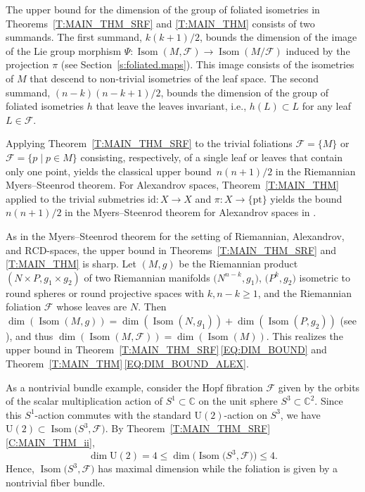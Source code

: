 \documentclass[10pt,a4paper]{amsart}
\numberwithin{equation}{section}
\theoremstyle{definition}
\DeclareMathOperator{\Iso}{Isom}
\newcommand{\C}{\mathbb{C}} %
\newcommand{\fol}{\mathcal{F}}
\begin{document}
The upper bound for the dimension of the group of foliated isometries in Theorems~\ref{T:MAIN_THM_SRF} and \ref{T:MAIN_THM} consists of two summands. The first summand, $k(k+1)/2$, bounds the dimension of the image of the Lie group morphism $\Psi\colon \Iso(M,\fol)\to \Iso(M/\fol)$ induced by the projection $\pi$ (see Section~\ref{s:foliated.maps}).
This image consists of the isometries of $M$ that descend to non-trivial isometries of the leaf space. The second summand, $(n-k)(n-k+1)/2$, bounds the dimension of the group of foliated isometries $h$ that leave the leaves invariant, i.e., $h(L)\subset L$ for any leaf $L\in \fol$.

Applying Theorem~\ref{T:MAIN_THM_SRF} to the trivial foliations $\fol = \{M\}$ or $\fol = \{{p}\mid p\in M\}$ consisting, respectively, of a single leaf or leaves that contain only one point, yields the classical upper bound~${n(n+1)/2}$ in the Riemannian Myers--Steenrod theorem. For Alexandrov spaces, Theorem~\ref{T:MAIN_THM} applied to the trivial submetries $\mathrm{id}\colon X \to X$ and $\pi\colon X \to \{\mathrm{pt}\}$ yields the bound $n(n+1)/2$ in the Myers--Steenrod theorem for Alexandrov spaces in \cite{GalazGarciaGuijarro2013}.

As in the Myers--Steenrod theorem for the setting of Riemannian, Alexandrov, and $\mathrm{RCD}$-spaces, the upper bound in Theorems~\ref{T:MAIN_THM_SRF} and \ref{T:MAIN_THM} is sharp. Let $(M,g)$ be the Riemannian product~${(N\times P, g_1\times g_2)}$ of two Riemannian manifolds $\bigl(N^{n-k},g_1\bigr)$, $\bigl(P^k,g_2\bigr)$ isometric to round spheres or round projective spaces
with $k,n-k\geq 1$,
and the Riemannian foliation $\fol$ whose leaves are $N$. Then $\dim(\Iso(M,g)) =\dim( \Iso(N,g_1))+\dim(\Iso(P,g_2))$ (see \cite[Corollary 1]{EschenburgHeintze1998}), and thus $\dim(\Iso(M,\fol)) = \dim(\Iso(M))$. This realizes the upper bound in Theorem~\ref{T:MAIN_THM_SRF}\,\eqref{EQ:DIM_BOUND} and Theorem~\ref{T:MAIN_THM}\,\eqref{EQ:DIM_BOUND_ALEX}.



As a nontrivial bundle example, consider the Hopf fibration $\fol$ given by the orbits of the scalar multiplication action of $S^1\subset \C$ on the unit sphere $S^3\subset \C^2$.
Since this $S^1$-action commutes with the standard $\mathrm{U}(2)$-action on $S^3$, we have $\mathrm{U}(2)\subset \Iso\bigl(S^3,\fol\bigr)$.
By Theorem~\ref{T:MAIN_THM_SRF}\,\ref{C:MAIN_THM_ii},
\[
\dim \mathrm{U}(2) = 4\leq \dim \bigl(\Iso\bigl(S^3,\fol\bigr)\bigr)\leq 4.
\]
Hence, $\Iso\bigl(S^3,\fol\bigr)$ has maximal dimension while the foliation is given by a nontrivial fiber bundle.
\end{document}
